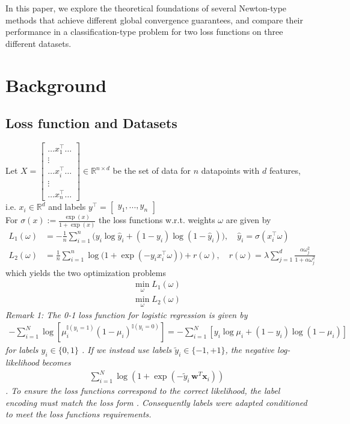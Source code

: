 \documentclass{article}
\begin{document}
In this paper, we explore the theoretical foundations of several Newton-type methods that achieve different global convergence guarantees, and compare their performance in a classification-type problem for two loss functions on three different datasets.
\section{Background}
\subsection{Loss function and Datasets}
Let 
$X = 
\begin{bmatrix}
\hdots x_1^\top \hdots \\
\vdots \\
\hdots x_i^\top \hdots\\
\vdots \\
\hdots x_n^\top \hdots
\end{bmatrix}
\in \mathbb{R}^{n \times d}$ \quad be the set of data for $n$ datapoints with $d$ features, i.e. $x_i \in \mathbb{R}^d$ and labels $y^\top = \begin{bmatrix} y_1,...,y_n\end{bmatrix}$\\
For $\sigma(x) := \frac{\exp(x)}{1+\exp(x)}$ the loss functions w.r.t. weights $\omega$ are given by
\begin{align}
L_1(\omega) &= -\frac{1}{n} \sum_{i=1}^{n} \Big( y_i \log \hat{y}_i + (1 - y_i) \log (1 - \hat{y}_i) \Big), \quad \hat{y}_i = \sigma(x_i^\top \omega) \\
L_2(\omega) &= \frac{1}{n} \sum_{i=1}^{n} \log\big(1 + \exp(-y_i x_i^\top \omega)\big) + r(\omega), \quad
r(\omega) = \lambda \sum_{j=1}^{d} \frac{\alpha \omega _j^2}{1 + \alpha \omega _j^2}
\end{align}
which yields the two optimization problems
\begin{align}
  \min _{\omega} L_1(\omega)\\
  \min _{\omega} L_2(\omega)
\end{align}
\textit{Remark 1: The 0-1 loss function for logistic regression is given by
\begin{align*}
  -\sum_{i=1}^N \log\left[ \mu_i^{\mathbb{I}(y_i=1)} (1-\mu_i)^{\mathbb{I}(y_i=0)} \right] 
  =  -\sum_{i=1}^N \left[ y_i \log \mu_i + (1 - y_i) \log(1-\mu_i) \right]
\end{align*}
for labels $y_i \in \{0,1\}$ \cite[Eq.~8.2--8.3]{murphy2012ml}.
If we instead use labels $\tilde{y}_i \in \{-1, +1\}$, the negative log-likelihood becomes
\begin{align*}
  \sum_{i=1}^N \log\left(1 + \exp(-\tilde{y}_i\,\mathbf{w}^T\mathbf{x}_i)\right)
\end{align*}
\cite[Eq.~8.4]{murphy2012ml}.
To ensure the loss functions correspond to the correct likelihood, the label encoding must match the loss form \cite[Sec.~8.3.1]{murphy2012ml}. Consequently labels were adapted conditioned to meet the loss functions requirements.}\\
\end{document}
